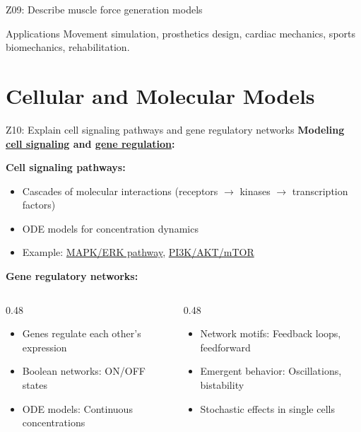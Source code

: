 \documentclass[aspectratio=169, 10pt]{beamer}
\begin{document}
\begin{frame}{Z09: Describe muscle force generation models}
    \vspace{0.2cm}
    {\small
    \begin{alertblock}{Applications}
        Movement simulation, prosthetics design, cardiac mechanics, sports biomechanics, rehabilitation.
    \end{alertblock}
    }
\end{frame}

\section{Cellular and Molecular Models}

\begin{frame}{Z10: Explain cell signaling pathways and gene regulatory networks}
    \textbf{Modeling \href{https://en.wikipedia.org/wiki/Cell_signaling}{cell signaling} and \href{https://en.wikipedia.org/wiki/Gene_regulatory_network}{gene regulation}:}
    
    \vspace{0.2cm}
    \textbf{Cell signaling pathways:}
    \begin{itemize}
        \item Cascades of molecular interactions (receptors $\rightarrow$ kinases $\rightarrow$ transcription factors)
        \item ODE models for concentration dynamics
        \item Example: \href{https://en.wikipedia.org/wiki/MAPK/ERK_pathway}{MAPK/ERK pathway}, \href{https://en.wikipedia.org/wiki/PI3K/AKT/mTOR_pathway}{PI3K/AKT/mTOR}
    \end{itemize}
    
    \vspace{0.2cm}
    \textbf{Gene regulatory networks:}
    \begin{columns}[T]
        \begin{column}{0.48\textwidth}
            \begin{itemize}
                \item Genes regulate each other's expression
                \item Boolean networks: ON/OFF states
                \item ODE models: Continuous concentrations
            \end{itemize}
        \end{column}
        \begin{column}{0.48\textwidth}
            \begin{itemize}
                \item Network motifs: Feedback loops, feedforward
                \item Emergent behavior: Oscillations, bistability
                \item Stochastic effects in single cells
            \end{itemize}
        \end{column}
    \end{columns}
    

\end{frame}
\end{document}
